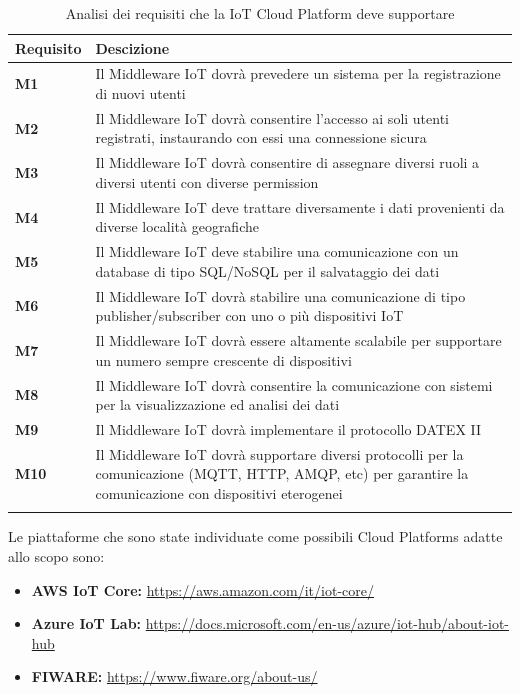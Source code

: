 \begin{longtable}{|m{2cm}|m{12cm}|}
	\hline
	\textbf{Requisito} & \textbf{Descizione} \\
	\hline
	\textbf{M1} &   Il Middleware IoT dovrà prevedere un sistema per la registrazione di nuovi utenti \\
	\hline
	\textbf{M2} &   Il Middleware IoT dovrà consentire l'accesso ai soli utenti registrati, instaurando con essi una connessione sicura \\
	\hline
	\textbf{M3} &   Il Middleware IoT dovrà consentire di assegnare diversi ruoli a diversi utenti con diverse permission \\
	\hline
	\textbf{M4} &   Il Middleware IoT deve trattare diversamente i dati provenienti da diverse località geografiche \\
	\hline
	\textbf{M5} &   Il Middleware IoT deve stabilire una comunicazione con un database di tipo SQL/NoSQL per il salvataggio dei dati \\
	\hline
	\textbf{M6} &   Il Middleware IoT dovrà  stabilire una comunicazione di tipo publisher/subscriber con uno o più dispositivi IoT\\
	\hline
	\textbf{M7} &   Il Middleware IoT dovrà essere altamente scalabile per supportare un numero sempre crescente di dispositivi \\
	\hline
	\textbf{M8} &   Il Middleware IoT dovrà consentire la comunicazione con sistemi per la visualizzazione ed analisi dei dati \\
	\hline
	\textbf{M9} &   Il Middleware IoT dovrà implementare il protocollo DATEX II \\
	\hline
	\textbf{M10} &   Il Middleware IoT dovrà supportare diversi protocolli per la comunicazione (MQTT, HTTP, AMQP, etc) per garantire la comunicazione con dispositivi eterogenei \\
	\hline
	\caption{Analisi dei requisiti che la IoT Cloud Platform deve supportare}
	\label{tabel:requisiti_middleware}
\end{longtable}
Le piattaforme che sono state individuate come possibili Cloud Platforms adatte allo scopo sono:
\begin{itemize}
	\item \textbf{AWS IoT Core: } \url{https://aws.amazon.com/it/iot-core/}
	\item \textbf{Azure IoT Lab: } \url{https://docs.microsoft.com/en-us/azure/iot-hub/about-iot-hub}
	\item \textbf{FIWARE: } \url{https://www.fiware.org/about-us/}
\end{itemize}
